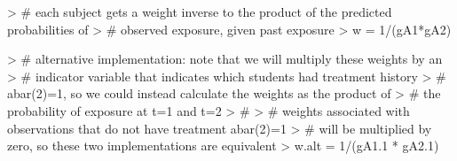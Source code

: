 \documentclass[answers]{exam}
\begin{document}
\begin{enumerate}
\begin{solution}
\begin{Schunk}
\begin{Sinput}
> # each subject gets a weight inverse to the product of the predicted probabilities of 
> # observed exposure, given past exposure
> w = 1/(gA1*gA2)
\end{Sinput}
\end{Schunk}
\begin{Schunk}
\begin{Sinput}
> # alternative implementation: note that we will multiply these weights by an 
> # indicator variable that indicates which students had treatment history 
> # abar(2)=1, so we could instead calculate the weights as the product of 
> # the probability of exposure at t=1 and t=2 
> #
> # weights associated with observations that do not have treatment abar(2)=1
> # will be multiplied by zero, so these two implementations are equivalent
> w.alt = 1/(gA1.1 * gA2.1)
\end{Sinput}
\end{Schunk}


\end{solution}
\end{enumerate}
\end{document}
